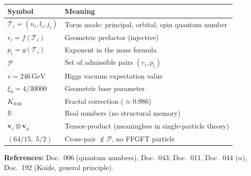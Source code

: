 \begin{center}
{\footnotesize
\begin{tabular}{lp{7cm}}
\toprule
\textbf{Symbol} & \textbf{Meaning} \\
\midrule
$\mathcal{T}_i = (n_i, l_i, j_i)$ & Torus mode: principal, orbital, spin quantum number \\
$r_i = f(\mathcal{T}_i)$ & Geometric prefactor (injective) \\
$p_i = g(\mathcal{T}_i)$ & Exponent in the mass formula \\
$\mathcal{P}$ & Set of admissible pairs $(r_i, p_i)$ \\
$v = 246\,\text{GeV}$ & Higgs vacuum expectation value \\
$\xi_0 = 4/30000$ & Geometric base parameter \\
$K_{\text{frak}}$ & Fractal correction ($\approx 0.986$) \\
$\mathbb{R}$ & Real numbers (no structural memory) \\
$\mathbf{v}_e \otimes \mathbf{v}_\mu$ & Tensor-product (meaningless in single-particle theory) \\
$(64/15,\;5/2)$ & Cross-pair $\notin \mathcal{P}$, no FFGFT particle \\
\bottomrule
\end{tabular}
}
\end{center}


\medskip\noindent
\textbf{References:} Doc.~006 (quantum numbers), Doc.~043, Doc.~011,
Doc.~044 ($\alpha$), Doc.~192 (Koide, general principle).
